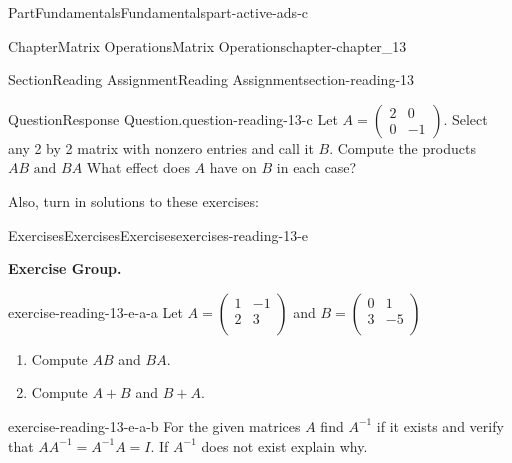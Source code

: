\documentclass[oneside,10pt,]{book}
\numberwithin{equation}{section}
\begin{document}
\begin{partptx}{Part}{Fundamentals}{}{Fundamentals}{}{}{part-active-ads-c}
\begin{chapterptx}{Chapter}{Matrix Operations}{}{Matrix Operations}{}{}{chapter-chapter_13}
\begin{sectionptx}{Section}{Reading Assignment}{}{Reading Assignment}{}{}{section-reading-13}
\begin{question}{Question}{Response Question.}{question-reading-13-c}
Let \(A=\left(\begin{array}{cc} 2 & 0\\ 0 & -1 \end{array}\right)\). Select any 2 by 2 matrix with nonzero entries and call it \(B\). Compute the products \(AB \textrm{ and }BA\)  What effect does \(A\) have on \(B\) in each case?%
\end{question}
Also, turn in solutions to these exercises:%
%
%
\typeout{************************************************}
\typeout{************************************************}
%
\begin{exercises-subsection-numberless}{Exercises}{Exercises}{}{Exercises}{}{}{exercises-reading-13-e}
\par\medskip\noindent%
\textbf{Exercise Group.}\space\space%
\begin{exercisegroup}
\begin{divisionexerciseeg}{1}{}{}{exercise-reading-13-e-a-a}%
Let \(A=\left(
\begin{array}{cc}
1 & -1 \\
2 & 3 \\
\end{array}
\right)\) and  \(B =\left(
\begin{array}{cc}
0 & 1 \\
3 & -5 \\
\end{array}
\right)\)%
\par
%
\begin{enumerate}[label=(\alph*)]
\item{}Compute \(A B\) and \(B A\).%
\item{}Compute \(A + B\) and \(B + A\).%
\end{enumerate}
%
\end{divisionexerciseeg}%
\begin{divisionexerciseeg}{2}{}{}{exercise-reading-13-e-a-b}%
For the given matrices \(A\) find \(A^{-1}\) if it exists and verify that \(A A^{-1}=A^{-1}A = I\). If \(A^{-1}\) does not exist explain why.%
\par
%
\end{divisionexerciseeg}
\end{exercisegroup}
\end{exercises-subsection-numberless}
\end{sectionptx}
\end{chapterptx}
\end{partptx}
\end{document}

